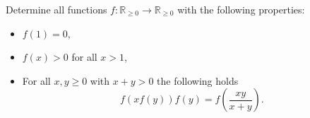 Determine all functions $f\colon\mathbb{R}_{\geq 0} \rightarrow \mathbb{R}_{\geq 0}$ with the following properties:
\begin{itemize}
    \item $f(1)=0$,
    \item $f(x)>0$ for all $x>1$,
    \item For all $x,y \geq 0$ with $x+y>0$ the following holds
    $$f(xf(y))f(y)=f\left(\frac{xy}{x+y}\right).$$
\end{itemize}
				
